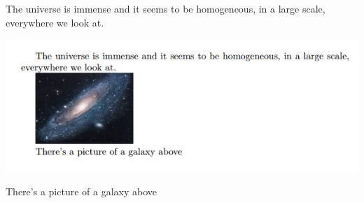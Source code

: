 \documentclass{article}
\begin{document}
The universe is immense and it seems to be homogeneous, 
in a large scale, everywhere we look at.

\includegraphics{universe.png}

There's a picture of a galaxy above
\end{document}
